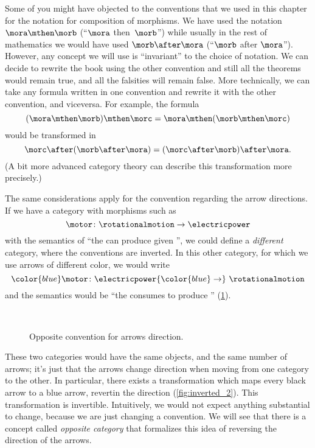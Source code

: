 Some of you might have objected to the conventions that we used in this chapter for the notation for composition of morphisms. We have used the notation $\mora \mthen \morb$ (``$\mora$ then~$\morb$'') while usually in the rest of mathematics we would have used $\morb \after \mora$ (``$\morb$ after $\mora$''). However, any concept we will use is ``invariant'' to the choice of notation. We can decide to rewrite the book using the other convention and still all the theorems would remain true, and all the falsities will remain false. More technically, we can take any formula written in one convention and rewrite it with the other convention, and viceversa. For example, the formula
%
\begin{equation*}
(\mora \mthen \morb)
  \mthen \morc = \mora \mthen (\morb \mthen \morc)
\end{equation*}
%
would be transformed in
%
\begin{equation*}
  \morc \after (\morb \after \mora) = (\morc \after \morb) \after \mora.
\end{equation*}
%
(A bit more advanced category theory can describe this transformation more precisely.)

The same considerations apply for the convention regarding the arrow directions.
If we have a category with morphisms such as
\begin{equation*}
  \motor \colon \rotationalmotion \to \electricpower
\end{equation*}
with the semantics of ``the \motor can produce \rotationalmotion given \electricpower'', we could define a \emph{different} category, where the conventions are inverted.
In this other category, for which we use arrows of different color, we would write
\begin{equation*}
{\color{blue}\motor}
  \colon \electricpower {\color{blue} \to}\  \rotationalmotion
\end{equation*}
and the semantics would be ``the \motor consumes \electricpower to produce \rotationalmotion'' (\cref{fig:inverted}).


\begin{figure}[h!]
  \centering
  \\[+15pt]
  \caption{Opposite convention for arrows direction. }
  \label{fig:inverted}
\end{figure}


These two categories would have the same objects, and the same number of arrows; it's just
that the arrows change direction when moving from one category to the other. In particular, there exists a transformation which maps every black arrow to a blue arrow, revertin the direction (\cref{fig:inverted_2}). This transformation is invertible.
Intuitively, we would not expect anything substantial to change, because we are
just changing a convention. We will see that there is a concept called \emph{opposite category}
that formalizes this idea of reversing the direction of the arrows.

